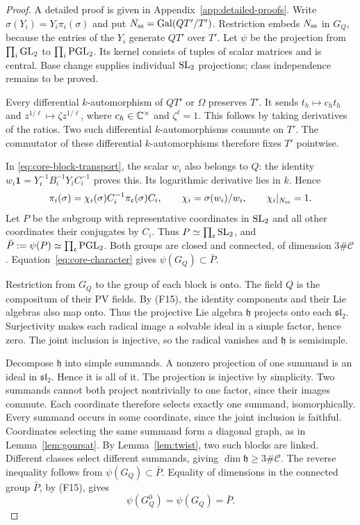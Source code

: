 \begin{proof}
A detailed proof is given in Appendix~\ref{app:detailed-proofs}.
Write $\sigma(Y_i)=Y_i\pi_i(\sigma)$ and put
$N_{\rm ss}=\operatorname{Gal}(QT'/T')$. Restriction embeds $N_{\rm ss}$ in $G_Q$,
because the entries of the $Y_i$ generate $QT'$ over $T'$. Let $\psi$
be the projection from $\prod_i\operatorname{GL}_2$ to $\prod_i\operatorname{PGL}_2$. Its kernel
consists of tuples of scalar matrices and is central.
Base change supplies individual $\operatorname{SL}_2$ projections; class independence remains to be proved.

Every differential $k$-automorphism of $QT'$ or $\Omega$ preserves $T'$. It sends
$t_h\mapsto c_ht_h$ and $z^{1/\ell}\mapsto\zeta z^{1/\ell}$,
where $c_h\in\mathbb{C}^\times$ and $\zeta^\ell=1$. This follows by taking
derivatives of the ratios. Two such differential $k$-automorphisms commute on $T'$.
The commutator of these differential $k$-automorphisms therefore fixes $T'$ pointwise.

In \eqref{eq:core-block-transport}, the scalar $w_i$ also belongs to $Q$:
the identity
$w_i\mathbf1=Y_{\mathfrak c}^{-1}B_i^{-1}Y_iC_i^{-1}$ proves this.
Its logarithmic derivative lies in $k$. Hence
\begin{equation}\label{eq:core-character}
 \pi_i(\sigma)=\chi_i(\sigma)C_i^{-1}\pi_{\mathfrak c}(\sigma)C_i,
 \qquad \chi_i=\sigma(w_i)/w_i,\qquad \chi_i|_{N_{\rm ss}}=1.
\end{equation}
Let $P$ be the subgroup with representative coordinates in $\operatorname{SL}_2$
and all other coordinates their conjugates by $C_i$. Thus
$P\simeq\prod_{\mathfrak c}\operatorname{SL}_2$, and
$\bar P:=\psi(P)\simeq\prod_{\mathfrak c}\operatorname{PGL}_2$. Both groups are closed
and connected, of dimension $3\#\mathcal C$.
Equation~\eqref{eq:core-character} gives $\psi(G_Q)\subset\bar P$.

Restriction from $G_Q$ to the group of each block is onto. The field $Q$ is the compositum of their PV fields. By (F15), the identity components
and their Lie algebras also map onto. Thus the projective Lie algebra
$\mathfrak h$ projects onto each $\mathfrak{sl}_2$.
Surjectivity makes each radical image a solvable ideal in a simple factor,
hence zero. The joint inclusion is injective, so the radical vanishes
and $\mathfrak h$ is semisimple.

Decompose $\mathfrak h$ into simple summands. A nonzero projection of one summand is an ideal in $\mathfrak{sl}_2$. Hence it is all of it. The projection is injective by simplicity. Two summands cannot both
project nontrivially to one factor, since their images commute.
Each coordinate therefore selects exactly one summand, isomorphically.
Every summand occurs in some coordinate, since the joint inclusion is faithful.
Coordinates selecting the same summand form a diagonal graph, as in
Lemma~\ref{lem:goursat}. By Lemma~\ref{lem:twist}, two such blocks are
linked. Different classes select different summands, giving
$\dim\mathfrak h\ge3\#\mathcal C$. The reverse inequality follows
from $\psi(G_Q)\subset\bar P$. Equality of dimensions in the connected
group $\bar P$, by (F15), gives
\begin{equation}\label{eq:core-projective-group}
 \psi(G_Q^0)=\psi(G_Q)=\bar P.
\end{equation}


\end{proof}
